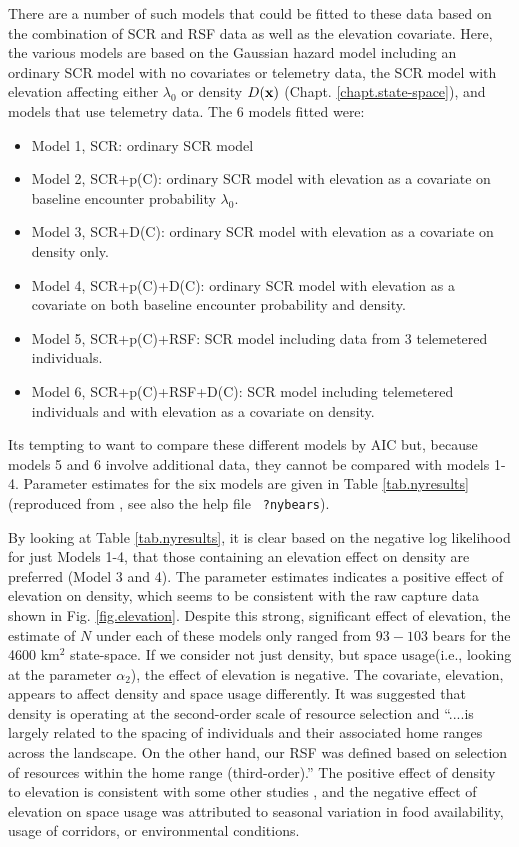 There are a number of such models that could be fitted to these data based on
the combination of SCR and RSF data as well as the elevation covariate.  
 Here, the various models are
 based on the Gaussian hazard model
including an ordinary SCR model with no covariates or telemetry data,
the SCR model with elevation affecting either $\lambda_{0}$ or density
$D({\bf x})$ (Chapt. \ref{chapt.state-space}), and models that use
telemetry data.  The 6 models fitted were:
\begin{itemize}
\item[] Model 1,  SCR: ordinary SCR model
\item[] Model 2, SCR+p(C): ordinary SCR model with elevation as a
  covariate on baseline encounter probability $\lambda_{0}$.
\item[] Model 3, SCR+D(C): ordinary SCR model with elevation as a
  covariate on density only.
\item[] Model 4, SCR+p(C)+D(C): ordinary SCR model with elevation as
  a covariate on both baseline encounter probability and density.
\item[] Model 5, SCR+p(C)+RSF: SCR model including data from 3
  telemetered individuals.
\item[] Model 6, SCR+p(C)+RSF+D(C): SCR model including telemetered
  individuals and with elevation as a covariate on density.
\end{itemize}
Its tempting to want to compare these different models by AIC but,
because models 5 and 6 involve additional data, they cannot be
compared with models 1-4.  Parameter estimates for the six models are
given in Table \ref{tab.nyresults} (reproduced from
\citet{royle_etal:2012mee}, see also the help file \mbox{\tt
  ?nybears}).

By looking at Table \ref{tab.nyresults}, it is clear based on the negative
log likelihood for just Models 1-4, that those containing an elevation effect
on density are preferred (Model 3 and 4).  The parameter estimates indicates a positive
effect of elevation on density, which seems to be consistent with 
the raw capture data shown in Fig. \ref{fig.elevation}.  Despite this strong, significant
effect of elevation, the estimate of $N$ under
each of these models only ranged from $93 - 103$ bears for the 4600 km$^2$ state-space.
If we consider not just density, but space usage(i.e., looking at the parameter $\alpha_2$),
the effect of elevation is negative.  The covariate, elevation, appears to affect
 density and space usage
differently.  It was suggested that
density is operating at the second-order scale of resource selection
and ``....is largely related to the spacing of individuals and their
associated home ranges across the landscape.   On the other hand, our RSF was defined
based on selection of resources within the home range (third-order).'' \citep{royle_etal:2012mee}
The positive effect of density to elevation is consistent with some
other studies  \citep[e.g.][]{frary_etal:2011}, and
the negative effect of elevation
on space usage was attributed to seasonal variation in food
availability, usage of corridors, or environmental conditions. 


